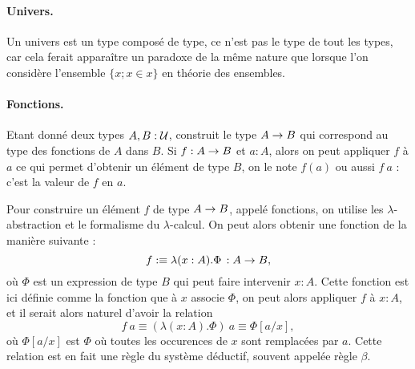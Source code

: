 \documentclass[../main.tex]{subfiles}
\begin{document}
  \paragraph{Univers.}

  Un univers est un type composé de type, ce n'est pas le type de tout les types,
  car cela ferait apparaître un paradoxe de la même nature que lorsque l'on considère l'ensemble
  $\{x ; x \in x\}$ en théorie des ensembles.

  \paragraph{Fonctions.}

  Etant donné deux types $A, B : \mathcal U$, construit le type $A \rightarrow B$ qui correspond au type des fonctions
  de $A$ dans $B$.
  Si $f : A \rightarrow B$ et $a : A$, alors on peut appliquer $f$ à $a$ ce qui permet d'obtenir un élément de type $B$,
  on le note $f(a)$ ou aussi $f\ a$ : c'est la valeur de $f$ en $a$.

  Pour construire un élément $f$ de type $A \rightarrow B$, appelé fonctions, on utilise les $\lambda$-abstraction
  et le formalisme du $\lambda$-calcul.
  On peut alors obtenir une fonction de la manière suivante :
  $$f :\equiv \lambda (x : A). \Phi \, : A \rightarrow B,$$
  où $\Phi$ est un expression de type $B$ qui peut faire intervenir $x : A$.
  Cette fonction est ici définie comme la fonction que à $x$ associe $\Phi$,
  on peut alors appliquer $f$ à $x : A$, et il serait alors naturel d'avoir la relation
  $$f\ a \equiv (\lambda (x : A). \Phi)\ a \equiv \Phi [a/x],$$
  où $\Phi [a/x]$ est $\Phi$ où toutes les occurences de $x$ sont remplacées par $a$.
  Cette relation est en fait une règle du système déductif, souvent appelée règle $\beta$.
\end{document}
